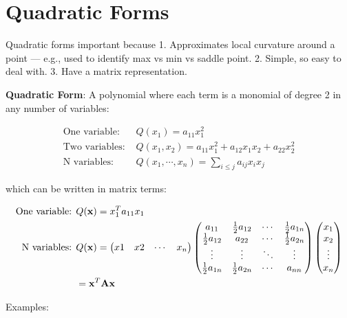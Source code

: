 \documentclass[]{book}
\theoremstyle{definition}
\theoremstyle{definition}
\theoremstyle{definition}
\theoremstyle{remark}
\begin{document}
\section{Quadratic Forms}\label{quadratic-forms}

Quadratic forms important because 1. Approximates local curvature around
a point --- e.g., used to identify max vs min vs saddle point. 2.
Simple, so easy to deal with. 3. Have a matrix representation.

\textbf{Quadratic Form}: A polynomial where each term is a monomial of
degree 2 in any number of variables:

\begin{align*}
\text{One variable: }& Q(x_1) = a_{11}x_1^2\\
\text{Two variables: }& Q(x_1,x_2) = a_{11}x_1^2 + a_{12}x_1x_2 + a_{22}x_2^2\\
\text{N variables: }& Q(x_1,\cdots,x_n)=\sum\limits_{i\le j} a_{ij}x_i x_j
\end{align*}

which can be written in matrix terms:

\begin{align*}
\text{One variable: }& Q({\bf x}) = x_1^T a_{11} x_1\\
\text{N variables: }& Q({\bf x})=\begin{pmatrix} x1&x2&\cdots&x_n\end{pmatrix}
\begin{pmatrix}
a_{11}&\frac{1}{2}a_{12}&\cdots&\frac{1}{2}a_{1n}\\
\frac{1}{2}a_{12}&a_{22}&\cdots&\frac{1}{2}a_{2n}\\
\vdots&\vdots&\ddots&\vdots\\
\frac{1}{2}a_{1n}&\frac{1}{2}a_{2n}&\cdots&a_{nn}
\end{pmatrix}
\begin{pmatrix} x_1\\x_2\\\vdots\\x_n\end{pmatrix}\\
&={\bf x}^T{\bf A}{\bf x}
\end{align*}

Examples:
\end{document}
